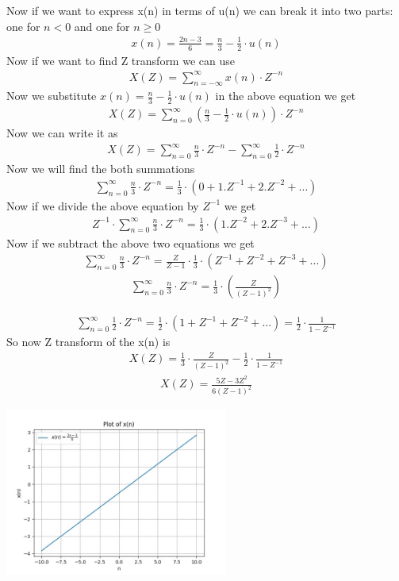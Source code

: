 \documentclass[journal,12pt,twocolumn]{IEEEtran}
\theoremstyle{remark}
\begin{document}
Now if we want to express x(n) in terms of u(n) we can break it into two parts: one for $n < 0 $ and one for $ n \ge 0$  
\begin{align} x(n) = \frac{2n-3}{6} = \frac{n}{3} - \frac{1}{2} \cdot u(n) \end{align}
\bigskip
Now if we want to find Z transform we can use
\begin{align} X(Z) = \sum_{n = -\infty}^{\infty} x(n) \cdot Z^{-n} \end{align}
\bigskip
Now we substitute
$x(n) = \frac{n}{3} - \frac{1}{2} \cdot u(n)$ in the above equation we get
\begin{align} X(Z) = \sum_{n = 0}^{\infty} (\frac{n}{3} - \frac{1}{2} \cdot u(n) )\cdot Z^{-n} \end{align}
\bigskip
Now we can write it as
\begin{align} X(Z) = \sum_{n=0}^{\infty} \frac{n}{3} \cdot Z^{-n} - \sum_{n=0}^{\infty} \frac{1}{2} \cdot Z^{-n} \end{align}
\bigskip
Now we will find the both summations
\begin{align} \sum_{n=0}^{\infty} \frac{n}{3} \cdot Z^{-n} = \frac{1}{3} \cdot (0 + 1.Z^{-1} + 2.Z^{-2} + \ldots) \end{align}
\bigskip
Now if we divide the above equation by $Z^{-1}$ we get
\begin{align} Z^{-1} \cdot \sum_{n=0}^{\infty} \frac{n}{3} \cdot Z^{-n} =\frac{1}{3} \cdot (1.Z^{-2} + 2.Z^{-3} + \ldots ) \end{align}
\bigskip
Now if we subtract the above two equations we get
\begin{align} \sum_{n=0}^{\infty} \frac{n}{3} \cdot Z^{-n} = \frac{Z}{Z-1} \cdot \frac{1}{3} \cdot (Z^{-1} + Z^{-2} + Z^{-3} + \ldots) \end{align}
\begin{align} \sum_{n=0}^{\infty} \frac{n}{3} \cdot Z^{-n} = \frac{1}{3} \cdot \left(\frac{Z}{(Z-1)^{2}}\right) \end{align}
\newpage

\begin{align} \sum_{n=0}^{\infty} \frac{1}{2} \cdot Z^{-n} = \frac{1}{2} \cdot (1+Z^{-1} + Z^{-2} + \ldots) = \frac{1}{2} \cdot \frac{1}{1- Z^{-1}} \end{align}
So now Z transform of the x(n) is
\begin{align} X(Z) = \frac{1}{3} \cdot \frac{Z}{(Z-1)^{2}} - \frac{1}{2} \cdot \frac{1}{1-Z^{-1}} \end{align}
\begin{align} X(Z) = {\frac{5Z-3 Z^{2}}{6(Z-1)^{2}}} \end{align}

\includegraphics[width=0.55\textwidth]{figs/graphgvv1.jpg}
\end{document}
